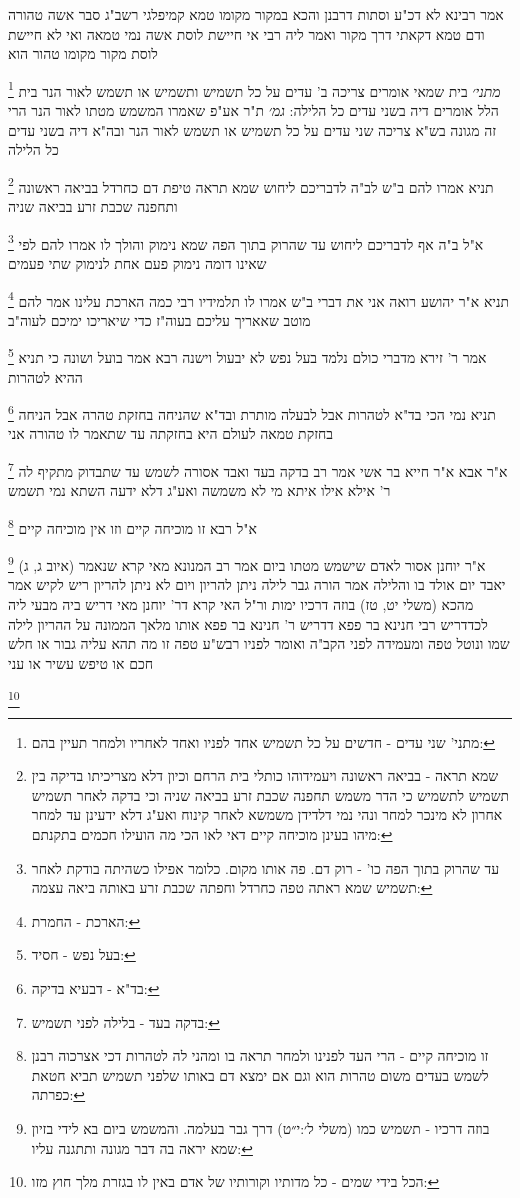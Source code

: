 \documentclass[12pt, openany]{book}
\newcommand{\footnotecomment}[1]{
	\renewcommand\thefootnote{}
	\footnote{#1}}
\newcommand{\commenta}[1]{\footnotecomment{#1}}
\begin{document}
{{אמר רבינא לא דכ"ע וסתות דרבנן והכא במקור מקומו טמא קמיפלגי 
רשב"ג סבר אשה טהורה ודם טמא דקאתי דרך מקור 
ואמר ליה רבי אי חיישת לוסת אשה נמי טמאה ואי לא חיישת לוסת מקור מקומו טהור הוא
\commenta{מתני' שני עדים - חדשים על כל תשמיש אחד לפניו ואחד לאחריו ולמחר תעיין בהם:}
{\large\emph{מתני׳}} בית שמאי אומרים צריכה ב' עדים על כל תשמיש ותשמיש או תשמש לאור הנר בית הלל אומרים דיה בשני עדים כל הלילה:
{\large\emph{גמ׳}} ת"ר אע"פ שאמרו המשמש מטתו לאור הנר הרי זה מגונה בש"א צריכה שני עדים על כל תשמיש או תשמש לאור הנר ובה"א דיה בשני עדים כל הלילה 
\commenta{שמא תראה - בביאה ראשונה ויעמידוהו כותלי בית הרחם וכיון דלא מצריכיתו בדיקה בין תשמיש לתשמיש כי הדר משמש תחפנה שכבת זרע בביאה שניה וכי בדקה לאחר תשמיש אחרון לא מינכר למחר ונהי נמי דלדידן משמשא לאחר קינוח ואע"ג דלא ידעינן עד למחר מיהו בעינן מוכיחה קיים דאי לאו הכי מה הועילו חכמים בתקנתם:}
תניא אמרו להם ב"ש לב"ה לדבריכם ליחוש שמא תראה טיפת דם כחרדל בביאה ראשונה ותחפנה שכבת זרע בביאה שניה 
\commenta{עד שהרוק בתוך הפה כו' - רוק דם. פה אותו מקום. כלומר אפילו כשהיתה בודקת לאחר תשמיש שמא ראתה טפה כחרדל וחפתה שכבת זרע באותה ביאה עצמה:}
א"ל ב"ה אף לדבריכם ליחוש עד שהרוק בתוך הפה שמא נימוק והולך לו 
אמרו להם לפי שאינו דומה נימוק פעם אחת לנימוק שתי פעמים 
\commenta{הארכת - החמרת:}
תניא א"ר יהושע רואה אני את דברי ב"ש אמרו לו תלמידיו רבי כמה הארכת עלינו אמר להם מוטב שאאריך עליכם בעוה"ז כדי שיאריכו ימיכם לעוה"ב 
\commenta{בעל נפש - חסיד:}
אמר ר' זירא מדברי כולם נלמד בעל נפש לא יבעול וישנה 
רבא אמר בועל ושונה כי תניא ההיא לטהרות 
\commenta{בד"א - דבעיא בדיקה:}
תניא נמי הכי בד"א לטהרות אבל לבעלה מותרת ובד"א שהניחה בחזקת טהרה אבל הניחה בחזקת טמאה לעולם היא בחזקתה עד שתאמר לו טהורה אני 
\commenta{בדקה בעד - בלילה לפני תשמיש:}
א"ר אבא א"ר חייא בר אשי אמר רב בדקה בעד ואבד אסורה לשמש עד שתבדוק מתקיף לה ר' אילא אילו איתא מי לא משמשה ואע"ג דלא ידעה השתא נמי תשמש 
\commenta{זו מוכיחה קיים - הרי העד לפנינו ולמחר תראה בו ומהני לה לטהרות דכי אצרכוה רבנן לשמש בעדים משום טהרות הוא וגם אם ימצא דם באותו שלפני תשמיש תביא חטאת כפרתה:}
א"ל רבא זו מוכיחה קיים וזו אין מוכיחה קיים
\commenta{בוזה דרכיו - תשמיש כמו (משלי ל׳:י״ט) דרך גבר בעלמה. והמשמש ביום בא לידי בזיון שמא יראה בה דבר מגונה ותתגנה עליו:}
א"ר יוחנן  אסור לאדם שישמש מטתו ביום אמר רב המנונא מאי קרא שנאמר (איוב ג, ג) יאבד יום אולד בו והלילה אמר הורה גבר לילה ניתן להריון ויום לא ניתן להריון ריש לקיש אמר מהכא (משלי יט, טז) בוזה דרכיו ימות 
ור"ל האי קרא דר' יוחנן מאי דריש ביה מבעי ליה לכדדריש רבי חנינא בר פפא דדריש ר' חנינא בר פפא אותו מלאך הממונה על ההריון לילה שמו ונוטל טפה ומעמידה לפני הקב"ה ואומר לפניו רבש"ע טפה זו מה תהא עליה גבור או חלש חכם או טיפש עשיר או עני 
\commenta{הכל בידי שמים - כל מדותיו וקורותיו של אדם באין לו בגזרת מלך חוץ מזו:}
}}
\end{document}
